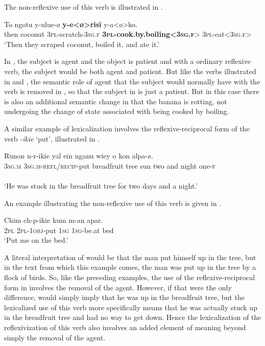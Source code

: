 \documentclass[output=paper]{langscibook}
\begin{document}
The non-reflexive use of this verb is illustrated in .

\ea%
    \label{ex:Brown:36}
    \gll To  ngotu  y-ulue-ø  \textbf{y-e<ø>risi}    y-a<ø>ko.\\
 then  coconut  \textsc{3pl}{}-scratch-\textsc{3sg.f}  \textbf{\textsc{3pl}}\textbf{{}-cook.by.boiling<}\textbf{\textsc{3sg.f}}> \textsc{3pl}{}-eat<\textsc{3sg.f}>\\
    \glt  ‘Then they scraped coconut, boiled it, and ate it.’
    \z

In , the subject is agent and the object is patient and with a ordinary reflexive verb, the subject would be both agent and patient. But like the verbs illustrated in  and , the semantic role of agent that the subject would normally have with the verb is removed in , so that the subject in  is just a patient. But in this case there is also an additional semantic change in that the banana is rotting, not undergoing the change of state associated with being cooked by boiling. 


  A similar example of lexicalization involves the reflexive-reciprocal form of the verb\emph{ -ikie} ‘put’, illustrated in .

\ea%
    \label{ex:Brown:37}
    \gll Runon  n-r-ikie  yal  ein  nganu  wiey  o kon  alpa-ø.\\
 \textsc{3sg.m}  \textsc{3sg.m}{}-\textsc{refl/recip}{}-put  breadfruit  tree  sun  two  and night  one-\textsc{f}\\\\
    \glt ‘He was stuck in the breadfruit tree for two days and a night.’
    \z

An example illustrating the non-reflexive use of this verb is given in .


\ea%
    \label{ex:Brown:38}
    \gll Chim  ch-p-ikie  kum  m-an  apar.\\
 \textsc{2pl}  \textsc{2pl}{}-\textsc{1obj}{}-put  \textsc{1sg}  \textsc{1sg}{}-be.at  bed\\
    \glt ‘Put me on the bed.’
    \z

          
A literal interpretation of  would be that the man put himself up in the tree, but in the text from which this example comes, the man was put up in the tree by a flock of birds. So, like the preceding examples, the use of the reflexive-reciprocal form in  involves the removal of the agent. However, if that were the only difference,  would simply imply that he was up in the breadfruit tree, but the lexicalized use of this verb more specifically means that he was actually stuck up in the breadfruit tree and had no way to get down. Hence the lexicalization of the reflexivization of this verb also involves an added element of meaning beyond simply the removal of the agent.
\end{document}
